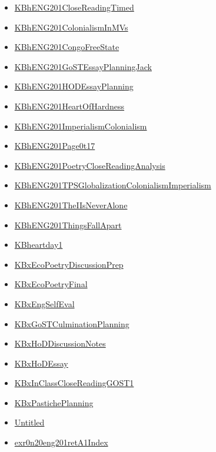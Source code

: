 \documentclass[11pt]{article}
\begin{document}
\begin{itemize}
\begin{itemize}
\item \href{eng201/KBhENG201CloseReadingTimed.org}{KBhENG201CloseReadingTimed}
\item \href{eng201/KBhENG201ColonialismInMVs.org}{KBhENG201ColonialismInMVs}
\item \href{eng201/KBhENG201CongoFreeState.org}{KBhENG201CongoFreeState}
\item \href{eng201/KBhENG201GoSTEssayPlanningJack.org}{KBhENG201GoSTEssayPlanningJack}
\item \href{eng201/KBhENG201HODEssayPlanning.org}{KBhENG201HODEssayPlanning}
\item \href{eng201/KBhENG201HeartOfHardness.org}{KBhENG201HeartOfHardness}
\item \href{eng201/KBhENG201ImperialismColonialism.org}{KBhENG201ImperialismColonialism}
\item \href{eng201/KBhENG201Page0t17.org}{KBhENG201Page0t17}
\item \href{eng201/KBhENG201PoetryCloseReadingAnalysis.org}{KBhENG201PoetryCloseReadingAnalysis}
\item \href{eng201/KBhENG201TPSGlobalizationColonialismImperialism.org}{KBhENG201TPSGlobalizationColonialismImperialism}
\item \href{eng201/KBhENG201TheIIsNeverAlone.org}{KBhENG201TheIIsNeverAlone}
\item \href{eng201/KBhENG201ThingsFallApart.org}{KBhENG201ThingsFallApart}
\item \href{eng201/KBheartday1.org}{KBheartday1}
\item \href{eng201/KBxEcoPoetryDiscussionPrep.org}{KBxEcoPoetryDiscussionPrep}
\item \href{eng201/KBxEcoPoetryFinal.org}{KBxEcoPoetryFinal}
\item \href{eng201/KBxEngSelfEval.org}{KBxEngSelfEval}
\item \href{eng201/KBxGoSTCulminationPlanning.org}{KBxGoSTCulminationPlanning}
\item \href{eng201/KBxHoDDiscussionNotes.org}{KBxHoDDiscussionNotes}
\item \href{eng201/KBxHoDEssay.org}{KBxHoDEssay}
\item \href{eng201/KBxInClassCloseReadingGOST1.org}{KBxInClassCloseReadingGOST1}
\item \href{eng201/KBxPastichePlanning.org}{KBxPastichePlanning}
\item \href{eng201/Untitled.org}{Untitled}
\item \href{eng201/exr0n20eng201retA1Index.org}{exr0n20eng201retA1Index}

\end{itemize}
\end{itemize}
\end{document}
